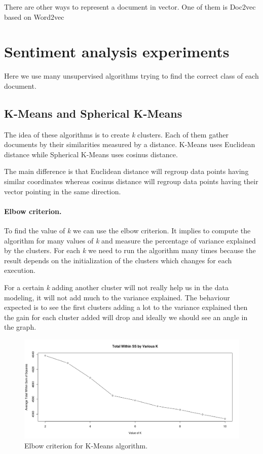 \documentclass{article}
\begin{document}
There are other ways to represent a document in vector. One of them is Doc2vec based on Word2vec


\section{Sentiment analysis experiments}

Here we use many unsupervised algorithms trying to find the correct class of each document.


\subsection{K-Means and Spherical K-Means}

The idea of these algorithms is to create \textit{k} clusters. Each of them gather documents by their similarities measured by a distance. K-Means uses Euclidean distance while Spherical K-Means uses cosinus distance.

The main difference is that Euclidean distance will regroup data points having similar coordinates whereas cosinus distance will regroup data points having their vector pointing in the same direction.

\paragraph{Elbow criterion.}
To find the value of \textit{k} we can use the elbow criterion. It implies to compute the algorithm for many values of \textit{k} and measure the percentage of variance explained by the clusters. For each \textit{k} we need to run the algorithm many times because the result depends on the initialization of the clusters which changes for each execution.

For a certain \textit{k} adding another cluster will not really help us in the data modeling, it will not add much to the variance explained. The behaviour expected is to see the first clusters adding a lot to the variance explained then the gain for each cluster added will drop and ideally we should see an angle in the graph.

\begin{figure}[h] \label{fig:elbow}
\centering
\includegraphics[width=\textwidth]{Kmeans_tf-idf-l2_elbow_criterion.png}
\caption{Elbow criterion for K-Means algorithm.}
\end{figure}
\end{document}
